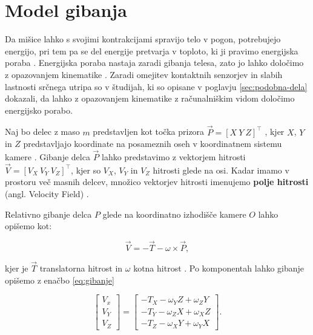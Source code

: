 \section{Model gibanja}\label{sec:model-gibanja}
Da mišice lahko s svojimi kontrakcijami spravijo telo v pogon, potrebujejo energijo, pri tem pa se del energije pretvarja v toploto, ki ji pravimo energijska poraba \cite{scott2005misconceptions}. Energijska poraba nastaja zaradi gibanja telesa, zato jo lahko določimo z opazovanjem kinematike \cite{levine2005measurement}. Zaradi omejitev kontaktnih senzorjev in slabih lastnosti srčnega utripa so v študijah, ki so opisane v poglavju \ref{sec:podobna-dela} dokazali, da lahko z opazovanjem kinematike z računalniškim vidom določimo energijsko porabo. 

Naj bo delec z maso $m$ predstavljen kot točka prizora $\vec{P} = [X~Y~Z]^\top$ , kjer $X$, $Y$ in $Z$ predstavljajo koordinate na posameznih oseh v koordinatnem sistemu kamere \cite{trucco1998introductory}. Gibanje delca $\vec{P}$ lahko predstavimo z vektorjem hitrosti $\vec{V} = [V_X~V_Y~V_Z]^\top$, kjer so $V_X$, $V_Y$ in $V_Z$ hitrosti glede na osi. Kadar imamo v prostoru več masnih delcev, množico vektorjev hitrosti imenujemo \textbf{polje hitrosti} (angl. Velocity Field) \cite{trucco1998introductory}. 

Relativno gibanje delca $P$ glede na koordinatno izhodišče kamere $O$ lahko opišemo kot:

\begin{equation}
	\vec{V} = -\vec{T}-\omega\times\vec{P},
\end{equation}

kjer je $\vec{T}$ translatorna hitrost in $\omega$ kotna hitrost \cite{trucco1998introductory}. Po komponentah lahko gibanje opišemo z enačbo \eqref{eq:gibanje}

\begin{equation} \label{eq:gibanje}
	\begin{bmatrix}
	V_x \\ V_Y \\ V_Z
	\end{bmatrix}
    =
    \begin{bmatrix}
    - T_X - \omega_Y Z + \omega_Z Y \\
    - T_Y - \omega_Z X + \omega_X Z \\
    - T_Z - \omega_X Y + \omega_Y X
    \end{bmatrix}.
\end{equation}

